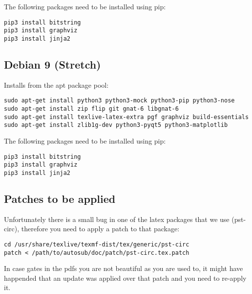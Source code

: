 The following packages need to be installed using pip:

\begin{verbatim}
pip3 install bitstring
pip3 install graphviz
pip3 install jinja2
\end{verbatim}


\subsection{Debian 9 (Stretch)}

Installs from the apt package pool:

\begin{verbatim}
sudo apt-get install python3 python3-mock python3-pip python3-nose
sudo apt-get install zip flip git gnat-6 libgnat-6
sudo apt-get install texlive-latex-extra pgf graphviz build-essentials
sudo apt-get install zlib1g-dev python3-pyqt5 python3-matplotlib
\end{verbatim}

The following packages need to be installed using pip:

\begin{verbatim}
pip3 install bitstring
pip3 install graphviz
pip3 install jinja2
\end{verbatim}

\subsection{Patches to be applied}
Unfortunately there is a small bug in one of the latex packages that we use
(pst-circ), therefore you need to apply a patch to that package:

\begin{verbatim}
cd /usr/share/texlive/texmf-dist/tex/generic/pst-circ
patch < /path/to/autosub/doc/patch/pst-circ.tex.patch
\end{verbatim}

In case gates in the pdfs you are not beautiful as you are used to, it might have
happended that an update was applied over that patch and you need to re-apply it.


